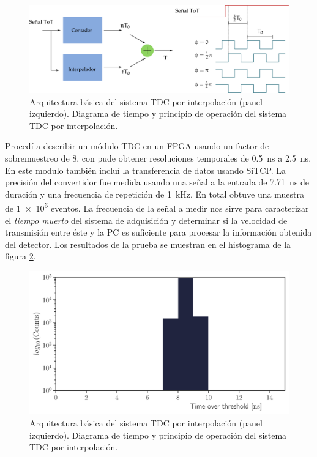 \begin{figure}
        \centering
        \includegraphics[width=\textwidth]{tdc-diagram.pdf}
        \caption{Arquitectura básica del sistema TDC por interpolación (panel izquierdo). Diagrama de tiempo y principio de operación del sistema TDC por interpolación.}
        \label{fig:tdc-diagram}
\end{figure}

Procedí a describir un módulo TDC en un FPGA usando un factor de sobremuestreo de \num{8}, con  pude obtener resoluciones temporales de \SI{0.5}{\nano\second} a \SI{2.5}{\nano\second}. En este modulo también incluí la transferencia de datos usando SiTCP. La precisión del convertidor fue medida usando una señal a la entrada de \SI{7.71}{\nano\second} de duración y una frecuencia de repetición de \SI{1}{\kilo\hertz}. En total obtuve una muestra de \num{1e5} eventos. La frecuencia de la señal a medir nos sirve para caracterizar el \emph{tiempo muerto} del sistema de adquisición y determinar si la velocidad de transmisión entre éste y la PC es suficiente para procesar la información obtenida del detector. Los resultados de la prueba se muestran en el histograma de la figura \ref{fig:tdc-lvds}.

\begin{figure}
        \centering
        \includegraphics[width=\textwidth]{tot-lvds.pdf}
        \caption{Arquitectura básica del sistema TDC por interpolación (panel izquierdo). Diagrama de tiempo y principio de operación del sistema TDC por interpolación.}
        \label{fig:tdc-lvds}
\end{figure}

